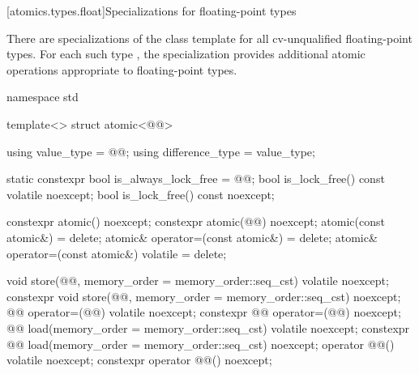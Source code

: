 [atomics.types.float]{Specializations for floating-point types}

%
\pnum
There are specializations of the 
class template for all cv-unqualified floating-point types.
For each such type ,
the specialization 
provides additional atomic operations appropriate to floating-point types.

\begin{codeblock}
namespace std {
  template<> struct atomic<@@> {
    using value_type = @@;
    using difference_type = value_type;

    static constexpr bool is_always_lock_free = @@;
    bool is_lock_free() const volatile noexcept;
    bool is_lock_free() const noexcept;

    constexpr atomic() noexcept;
    constexpr atomic(@@) noexcept;
    atomic(const atomic&) = delete;
    atomic& operator=(const atomic&) = delete;
    atomic& operator=(const atomic&) volatile = delete;

    void store(@@, memory_order = memory_order::seq_cst) volatile noexcept;
    constexpr void store(@@, memory_order = memory_order::seq_cst) noexcept;
    @@ operator=(@@) volatile noexcept;
    constexpr @@ operator=(@@) noexcept;
    @@ load(memory_order = memory_order::seq_cst) volatile noexcept;
    constexpr @@ load(memory_order = memory_order::seq_cst) noexcept;
    operator @@() volatile noexcept;
    constexpr operator @@() noexcept;

}}
\end{codeblock}
